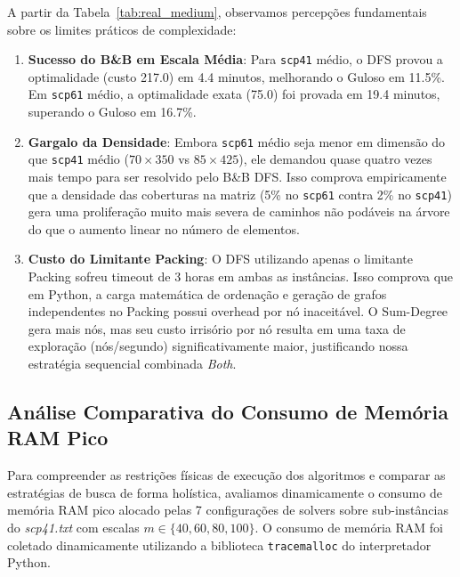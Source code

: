 \documentclass[conference]{IEEEtran}
\begin{document}
A partir da Tabela~\ref{tab:real_medium}, observamos percepções fundamentais sobre os limites práticos de complexidade:
\begin{enumerate}
\item \textbf{Sucesso do B\&B em Escala Média}: Para \texttt{scp41} médio, o DFS provou a optimalidade (custo 217.0) em 4.4 minutos, melhorando o Guloso em 11.5\%. Em \texttt{scp61} médio, a optimalidade exata (75.0) foi provada em 19.4 minutos, superando o Guloso em 16.7\%.
\item \textbf{Gargalo da Densidade}: Embora \texttt{scp61} médio seja menor em dimensão do que \texttt{scp41} médio ($70 \times 350$ vs $85 \times 425$), ele demandou quase quatro vezes mais tempo para ser resolvido pelo B\&B DFS. Isso comprova empiricamente que a densidade das coberturas na matriz (5\% no \texttt{scp61} contra 2\% no \texttt{scp41}) gera uma proliferação muito mais severa de caminhos não podáveis na árvore do que o aumento linear no número de elementos.
\item \textbf{Custo do Limitante Packing}: O DFS utilizando apenas o limitante Packing sofreu timeout de 3 horas em ambas as instâncias. Isso comprova que em Python, a carga matemática de ordenação e geração de grafos independentes no Packing possui overhead por nó inaceitável. O Sum-Degree gera mais nós, mas seu custo irrisório por nó resulta em uma taxa de exploração (nós/segundo) significativamente maior, justificando nossa estratégia sequencial combinada \textit{Both}.
\end{enumerate}

\subsection{Análise Comparativa do Consumo de Memória RAM Pico}
Para compreender as restrições físicas de execução dos algoritmos e comparar as estratégias de busca de forma holística, avaliamos dinamicamente o consumo de memória RAM pico alocado pelas 7 configurações de solvers sobre sub-instâncias do \textit{scp41.txt} com escalas $m \in \{40, 60, 80, 100\}$. O consumo de memória RAM foi coletado dinamicamente utilizando a biblioteca \texttt{tracemalloc} do interpretador Python.
\end{document}
